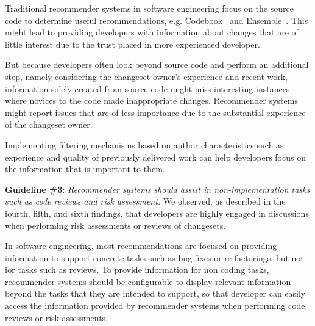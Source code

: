Traditional recommender systems in software engineering focus on the source code to determine useful recommendations, e.g. Codebook~\cite{begel:icse:2010} and Ensemble~\cite{xiang:rsse:2008}.
This might lead to providing developers with information about changes that are of little interest due to the trust placed in more experienced developer. 

But because developers often look beyond source code and perform an additional step, namely considering the changeset owner's experience and recent work, information solely created from source code might miss interesting instances where novices to the code made inappropriate changes.
Recommender systems might report issues that are of less importance due to the substantial experience of the changeset owner.

Implementing filtering mechanisms based on author characteristics such as experience and quality of previously delivered work can help developers focus on the information that is important to them.



\textbf{Guideline \#3}: \emph{Recommender systems should assist in non-implementation tasks such as code reviews and risk assessment.} 
We observed, as described in the fourth, fifth, and sixth findings, that developers are highly engaged in discussions when performing risk assessments or reviews of changesets. 

In software engineering, most recommendations are focused on providing information to support concrete tasks such as bug fixes or re-factorings, but not for tasks such as reviews. To provide information for non coding tasks, recommender systems should be configurable to display relevant information beyond the tasks that they are intended to support, so that developer can easily access the information provided by recommender systems when performing code reviews or risk assessments.



